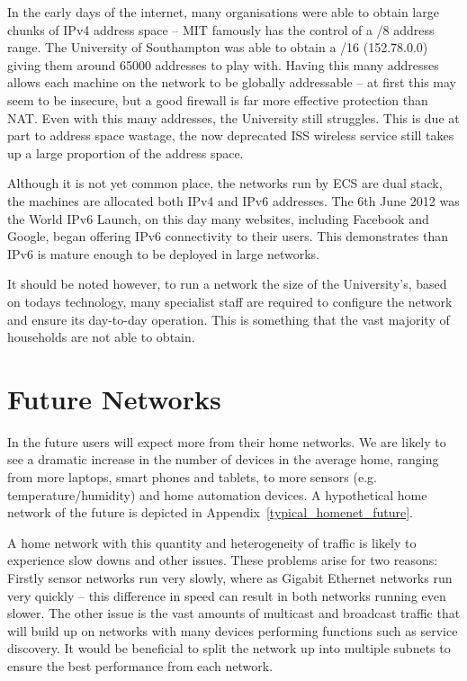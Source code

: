\documentclass[12pt]{report}
\begin{document}
In the early days of the internet, many organisations were able to obtain large
chunks of IPv4 address space -- MIT famously has the control of a /8 address
range. The University of Southampton was able to obtain a /16 (152.78.0.0)
giving them around 65000 addresses to play with. Having this many addresses
allows each machine on the network to be globally addressable -- at first this
may seem to be insecure, but a good firewall is far more effective protection
than NAT\@. Even with this many addresses, the University still struggles. This
is due at part to address space wastage, the now deprecated ISS wireless
service still takes up a large proportion of the address space.

Although it is not yet common place, the networks run by ECS are dual stack,
the machines are allocated both IPv4 and IPv6 addresses. The 6th June 2012 was
the World IPv6 Launch, on this day many websites, including Facebook and
Google, began offering IPv6 connectivity to their users. This demonstrates than
IPv6 is mature enough to be deployed in large networks.

It should be noted however, to run a network the size of the University's,
based on todays technology, many specialist staff are required to configure the
network and ensure its day-to-day operation. This is something that the vast
majority of households are not able to obtain.

\section{Future Networks}
In the future users will expect more from their home networks. We are likely to
see a dramatic increase in the number of devices in the average home, ranging
from more laptops, smart phones and tablets, to more sensors (e.g.\@
temperature/humidity)  and home automation devices. A hypothetical home network
of the future is depicted in Appendix~\ref{typical_homenet_future}.

A home network with this quantity and heterogeneity of traffic is likely to
experience slow downs and other issues. These problems arise for two reasons:
Firstly sensor networks run very slowly, where as Gigabit Ethernet networks run
very quickly -- this difference in speed can result in both networks running
even slower. The other issue is the vast amounts of multicast and broadcast
traffic that will build up on networks with many devices performing functions
such as service discovery. It would be beneficial to split the network up into
multiple subnets to ensure the best performance from each network. 
\end{document}
